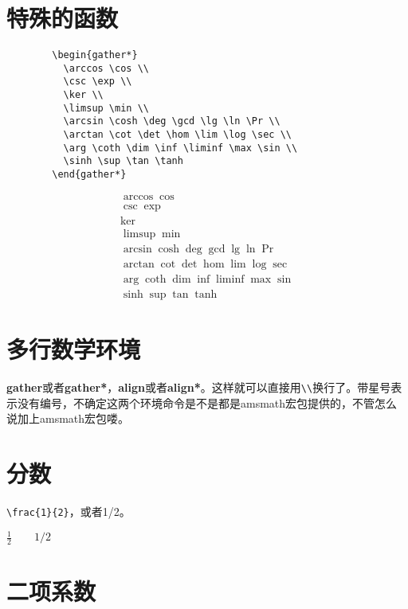 \documentclass[11pt,oneside]{book}
\begin{document}
      \section{特殊的函数}
      \begin{Verbatim}
        \begin{gather*}
          \arccos \cos \\
          \csc \exp \\
          \ker \\
          \limsup \min \\
          \arcsin \cosh \deg \gcd \lg \ln \Pr \\
          \arctan \cot \det \hom \lim \log \sec \\
          \arg \coth \dim \inf \liminf \max \sin \\
          \sinh \sup \tan \tanh
        \end{gather*}
      \end{Verbatim}

      \begin{gather*}
        \arccos \cos \\
        \csc \exp \\
        \ker \\
        \limsup \min \\
        \arcsin \cosh \deg \gcd \lg \ln \Pr \\
        \arctan \cot \det \hom \lim \log \sec \\
        \arg \coth \dim \inf \liminf \max \sin \\
        \sinh \sup \tan \tanh
      \end{gather*}

      \section{多行数学环境}
      \textbf{gather}或者\textbf{gather*}，\textbf{align}或者\textbf{align*}。这样就可以直接用\verb+\\+换行了。带星号表示没有编号，不确定这两个环境命令是不是都是amsmath宏包提供的，不管怎么说加上amsmath宏包喽。

      \section{分数}
      \verb+\frac{1}{2}+，或者1/2。

      $\frac{1}{2} \qquad 1/2$



      \section{二项系数}
\end{document}
